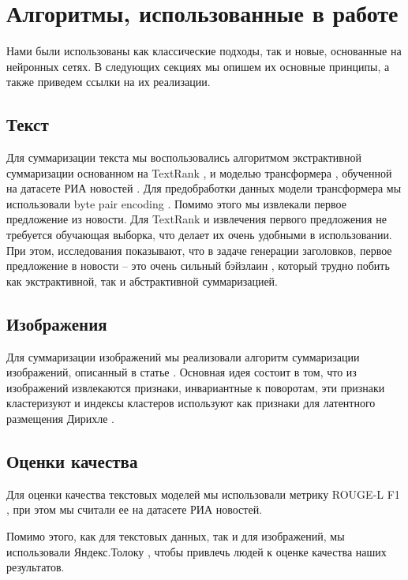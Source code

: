 \documentclass[aps,%
12pt,%
final,%
oneside,
onecolumn,%
musixtex, %
superscriptaddress,%
centertags]{article} %
\begin{document}
\section{Алгоритмы, использованные в работе}
Нами были использованы как классические подходы, так и новые, основанные на нейронных сетях.
В следующих секциях мы опишем их основные принципы, а также приведем ссылки на их реализации.

\subsection{Текст}
Для суммаризации текста мы воспользовались алгоритмом экстрактивной суммаризации
основанном на TextRank \cite{DBLP:journals/corr/BarriosLAW16},
и моделью трансформера \cite{DBLP:journals/corr/VaswaniSPUJGKP17}, обученной на
датасете РИА новостей \cite{gavrilov2018self}.
Для предобработки данных модели трансформера мы использовали byte
pair encoding \cite{DBLP:journals/corr/SennrichHB15}.
Помимо этого мы извлекали первое предложение из новости.
Для TextRank и извлечения первого предложения не требуется обучающая выборка, что
делает их очень удобными в использовании. При этом, исследования показывают, что
в задаче генерации заголовков, первое предложение в новости --
это очень сильный бэйзлаин \cite{gavrilov2018self},
который трудно побить как экстрактивной, так и абстрактивной суммаризацией.

\subsection{Изображения}
Для суммаризации изображений мы реализовали алгоритм суммаризации изображений,
описанный в статье \cite{DBLP:conf/icsipa/SharmaKASK15}.
Основная идея состоит в том, что из изображений извлекаются
признаки, инвариантные к поворотам, эти признаки кластеризуют и индексы кластеров
используют как признаки для латентного размещения
Дирихле \cite{Blei:2003:LDA:944919.944937}.

\subsection{Оценки качества}
Для оценки качества текстовых моделей мы использовали метрику ROUGE-L F1 \cite{Lin:2004},
при этом мы считали ее на датасете РИА новостей.

Помимо этого, как для текстовых данных, так и для изображений, мы  использовали
Яндекс.Толоку \cite{yandex_toloka_2019}, чтобы привлечь людей к оценке качества наших результатов.
\end{document}
